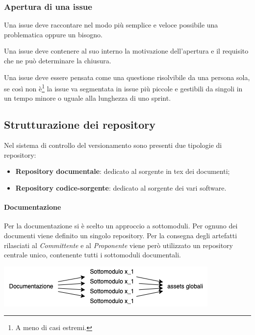 \subsubsection{Apertura di una issue}\label{sss:issue}

Una issue deve raccontare nel modo più semplice e veloce possibile una problematica oppure un bisogno.

Una issue deve contenere al suo interno la motivazione dell'apertura e il requisito che ne può determinare la chiusura.

Una issue deve essere pensata come una questione risolvibile da una persona sola, se così non è\footnote{A meno di casi estremi.} la issue va segmentata in issue più piccole e gestibili da singoli in un tempo minore o uguale alla lunghezza di uno sprint.


\subsection{Strutturazione dei repository}

Nel sistema di controllo del versionamento sono presenti due tipologie di repository:

\begin{itemize}
    \item \textbf{Repository documentale}: dedicato al sorgente in tex dei documenti;
    \item \textbf{Repository codice-sorgente}: dedicato al sorgente dei vari software.
\end{itemize}

\paragraph{Documentazione} Per la documentazione si è scelto un approccio a sottomoduli. Per ognuno dei documenti viene definito un singolo repository. Per la consegna degli artefatti rilasciati al \textit{Committente} e al \textit{Proponente} viene però utilizzato un repository centrale unico, contenente tutti i sottomoduli documentali.

\begin{center}
\includegraphics[width=0.6\linewidth]{img/struttura-repo-doc.png}
\end{center}
